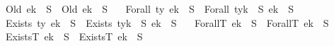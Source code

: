 \begin{isabellebody}
\ \ {\isacharbar}{\kern0pt}\ {\isachardoublequoteopen}{\isacharparenleft}{\kern0pt}Old\ e{\isacharparenright}{\kern0pt}{\isacharbrackleft}{\kern0pt}k\ {\isasymmapsto}\isactrlsub {\isasymtau}\ S{\isacharbrackright}{\kern0pt}\ {\isacharequal}{\kern0pt}\ Old\ {\isacharparenleft}{\kern0pt}e{\isacharbrackleft}{\kern0pt}k\ {\isasymmapsto}\isactrlsub {\isasymtau}\ S{\isacharbrackright}{\kern0pt}{\isacharparenright}{\kern0pt}{\isachardoublequoteclose}\isanewline
\ \ {\isacharbar}{\kern0pt}\ {\isachardoublequoteopen}{\isacharparenleft}{\kern0pt}Forall\ ty\ e{\isacharparenright}{\kern0pt}{\isacharbrackleft}{\kern0pt}k\ {\isasymmapsto}\isactrlsub {\isasymtau}\ S{\isacharbrackright}{\kern0pt}\ {\isacharequal}{\kern0pt}\ {\isacharparenleft}{\kern0pt}Forall\ {\isacharparenleft}{\kern0pt}ty{\isacharbrackleft}{\kern0pt}k\ {\isasymmapsto}\isactrlsub {\isasymtau}\ S{\isacharbrackright}{\kern0pt}\isactrlsub {\isasymtau}{\isacharparenright}{\kern0pt}\ {\isacharparenleft}{\kern0pt}e{\isacharbrackleft}{\kern0pt}k\ {\isasymmapsto}\isactrlsub {\isasymtau}\ S{\isacharbrackright}{\kern0pt}{\isacharparenright}{\kern0pt}{\isacharparenright}{\kern0pt}{\isachardoublequoteclose}\isanewline
\ \ {\isacharbar}{\kern0pt}\ {\isachardoublequoteopen}{\isacharparenleft}{\kern0pt}Exists\ ty\ e{\isacharparenright}{\kern0pt}{\isacharbrackleft}{\kern0pt}k\ {\isasymmapsto}\isactrlsub {\isasymtau}\ S{\isacharbrackright}{\kern0pt}\ {\isacharequal}{\kern0pt}\ {\isacharparenleft}{\kern0pt}Exists\ {\isacharparenleft}{\kern0pt}ty{\isacharbrackleft}{\kern0pt}k\ {\isasymmapsto}\isactrlsub {\isasymtau}\ S{\isacharbrackright}{\kern0pt}\isactrlsub {\isasymtau}{\isacharparenright}{\kern0pt}\ {\isacharparenleft}{\kern0pt}e{\isacharbrackleft}{\kern0pt}k\ {\isasymmapsto}\isactrlsub {\isasymtau}\ S{\isacharbrackright}{\kern0pt}{\isacharparenright}{\kern0pt}{\isacharparenright}{\kern0pt}{\isachardoublequoteclose}\isanewline
\ \ {\isacharbar}{\kern0pt}\ {\isachardoublequoteopen}{\isacharparenleft}{\kern0pt}ForallT\ e{\isacharparenright}{\kern0pt}{\isacharbrackleft}{\kern0pt}k\ {\isasymmapsto}\isactrlsub {\isasymtau}\ S{\isacharbrackright}{\kern0pt}\ {\isacharequal}{\kern0pt}\ {\isacharparenleft}{\kern0pt}ForallT\ {\isacharparenleft}{\kern0pt}e{\isacharbrackleft}{\kern0pt}k{\isacharplus}{\kern0pt}{}\ {\isasymmapsto}\isactrlsub {\isasymtau}\ S{\isacharbrackright}{\kern0pt}{\isacharparenright}{\kern0pt}{\isacharparenright}{\kern0pt}{\isachardoublequoteclose}\isanewline
\ \ {\isacharbar}{\kern0pt}\ {\isachardoublequoteopen}{\isacharparenleft}{\kern0pt}ExistsT\ e{\isacharparenright}{\kern0pt}{\isacharbrackleft}{\kern0pt}k\ {\isasymmapsto}\isactrlsub {\isasymtau}\ S{\isacharbrackright}{\kern0pt}\ {\isacharequal}{\kern0pt}\ {\isacharparenleft}{\kern0pt}ExistsT\ {\isacharparenleft}{\kern0pt}e{\isacharbrackleft}{\kern0pt}k{\isacharplus}{\kern0pt}{}\ {\isasymmapsto}\isactrlsub {\isasymtau}\ S{\isacharbrackright}{\kern0pt}{\isacharparenright}{\kern0pt}{\isacharparenright}{\kern0pt}{\isachardoublequoteclose}%

\end{isabellebody}
